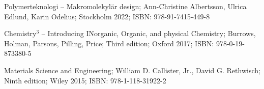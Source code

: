 \begin{thebibliography}{0}
    Polymerteknologi -- Makromolekylär design; Ann-Christine Albertsson, Ulrica Edlund, Karin Odelius; Stockholm 2022; ISBN: 978-91-7415-449-8

    Chemistry$^3$ -- Introducing INorganic, Organic, and physical Chemistry; Burrows, Holman, Parsons, Pilling, Price; Third edition; Oxford 2017; ISBN: 978-0-19-873380-5

    Materials Science and Engineering; William D. Callister, Jr., David G. Rethwisch; Ninth edition; Wiley 2015; ISBN: 978-1-118-31922-2
\end{thebibliography}